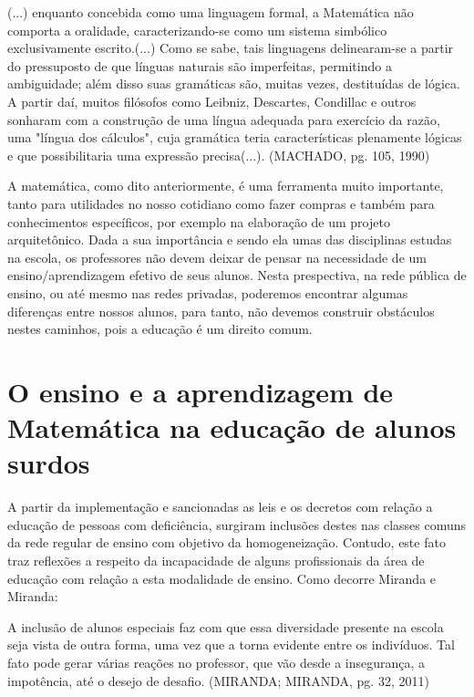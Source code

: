 \documentclass[brasil]{abnt}
\begin{document}
	\begin{citacao}(...) enquanto concebida como uma linguagem formal, a Matemática não comporta a oralidade, caracterizando-se como um sistema simbólico exclusivamente escrito.(...) 
					Como se sabe, tais linguagens delinearam-se a partir do pressuposto de que línguas naturais são imperfeitas, permitindo a ambiguidade; além disso suas gramáticas são, muitas vezes, 
					destituídas de lógica. A partir daí, muitos filósofos como Leibniz, Descartes, Condillac e outros sonharam com a construção de uma língua adequada para exercício da razão, uma "língua 
					dos cálculos", cuja gramática teria características plenamente lógicas e que possibilitaria uma expressão precisa(...). (MACHADO, pg. 105, 1990)
	\end{citacao}
	
	A matemática, como dito anteriormente, é uma ferramenta muito importante, tanto para utilidades no nosso cotidiano como fazer compras e também para conhecimentos específicos, por exemplo na elaboração 
	de um projeto arquitetônico. Dada a sua importância e sendo ela umas das disciplinas estudas na escola, os professores não devem deixar de pensar na necessidade de um ensino/aprendizagem 
	efetivo de seus alunos. Nesta prespectiva, na rede pública de ensino, ou até mesmo nas redes privadas, poderemos encontrar algumas diferenças entre nossos alunos, para tanto, não devemos construir
	obstáculos nestes caminhos, pois a educação é um direito comum. 
	
					
\chapter{O ensino e a aprendizagem de Matemática na educação de alunos surdos}	
	A partir da implementação e sancionadas as leis e os decretos com relação a educação de pessoas com deficiência, surgiram inclusões destes nas classes comuns da rede regular de ensino com objetivo da 
	homogeneização. Contudo, este fato traz reflexões a respeito da incapacidade de alguns profissionais da área de educação com relação a esta modalidade de ensino. Como decorre Miranda e Miranda:
		
			\begin{citacao} A inclusão de alunos especiais faz com que essa diversidade presente na escola seja vista de outra forma, uma vez que a torna evidente entre os indivíduos. Tal fato pode gerar 
							várias reações no professor, que vão desde a insegurança, a impotência, até o desejo de desafio. (MIRANDA; MIRANDA, pg. 32, 2011)   			
			\end{citacao}
						
\end{document}
